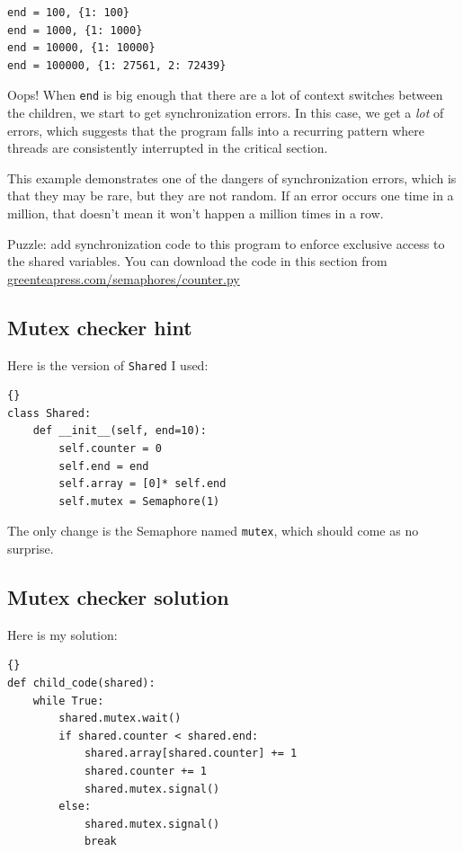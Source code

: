 \documentclass{book}
\newcommand{\clearemptydoublepage}{\newpage\cleardoublepage}
\begin{document}
\begin{verbatim}
end = 100, {1: 100}
end = 1000, {1: 1000}
end = 10000, {1: 10000}
end = 100000, {1: 27561, 2: 72439}
\end{verbatim}
%
Oops!  When {\tt end} is big enough that there are a lot of
context switches between the children, we start to get synchronization
errors.  In this case, we get a {\em lot} of errors, which suggests
that the program falls into a recurring pattern where threads are 
consistently interrupted in the critical section.

This example demonstrates one of the dangers of synchronization
errors, which is that they may be rare, but they are not random.
If an error occurs one time in a million, that doesn't mean it
won't happen a million times in a row.

Puzzle: add synchronization code to this program to enforce
exclusive access to the shared variables.  You can download the
code in this section from \url{greenteapress.com/semaphores/counter.py}


\clearemptydoublepage
\subsection {Mutex checker hint}

Here is the version of {\tt Shared} I used:

\begin{lstlisting}[title={}]{}
class Shared:
    def __init__(self, end=10):
        self.counter = 0
        self.end = end
        self.array = [0]* self.end
        self.mutex = Semaphore(1)
\end{lstlisting}

The only change is the Semaphore named {\tt mutex}, which should
come as no surprise.

\clearemptydoublepage
\subsection {Mutex checker solution}

Here is my solution:

\begin{lstlisting}[title={}]{}
def child_code(shared):
    while True:
        shared.mutex.wait()
        if shared.counter < shared.end:
            shared.array[shared.counter] += 1
            shared.counter += 1
            shared.mutex.signal()
        else:
            shared.mutex.signal()
            break
\end{lstlisting}
\end{document}
